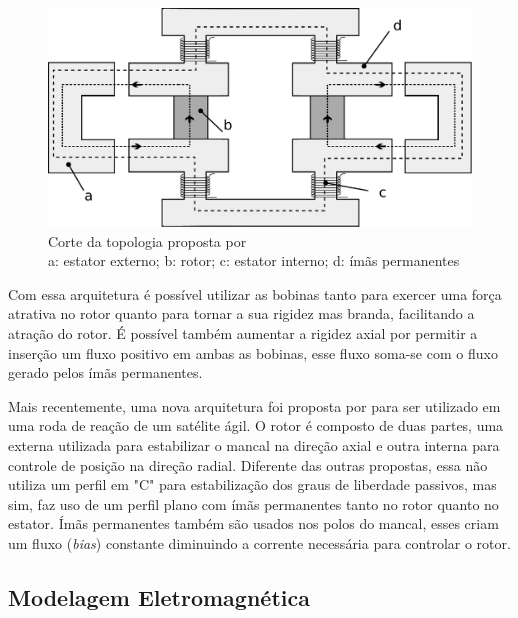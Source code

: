 
\begin{figure}[!ht]
	\centering
	\includegraphics[width=0.8\linewidth]{./Figs/mancais/alemao.pdf}
	\caption{Corte da topologia proposta por \cite{Scharfe2001} \\
	a: estator externo; b: rotor; c: estator interno; d: ímãs permanentes}
	\label{Fig:modelo:alemao}
\end{figure} 

Com essa arquitetura é possível utilizar as bobinas tanto para exercer uma força atrativa no rotor quanto para tornar a sua rigidez mas branda, facilitando a atração do rotor. É possível também aumentar a rigidez axial por permitir a inserção um fluxo positivo em ambas as bobinas, esse fluxo soma-se com o fluxo gerado pelos ímãs permanentes.

Mais recentemente, uma nova arquitetura foi proposta por \citet{Bangcheng2012} para ser utilizado em uma roda de reação de um satélite ágil.  O rotor é composto de duas partes, uma externa utilizada para estabilizar o mancal na direção axial e outra interna para controle de posição na direção radial. Diferente das outras propostas, essa não utiliza um perfil em "C" para estabilização dos graus de liberdade passivos, mas sim, faz uso de um perfil plano com ímãs permanentes tanto no rotor quanto no estator.  Ímãs permanentes também são usados nos polos do mancal, esses criam um fluxo (\textit{bias}) constante diminuindo a corrente necessária para controlar o rotor.
 

\subsection{Modelagem Eletromagnética}

